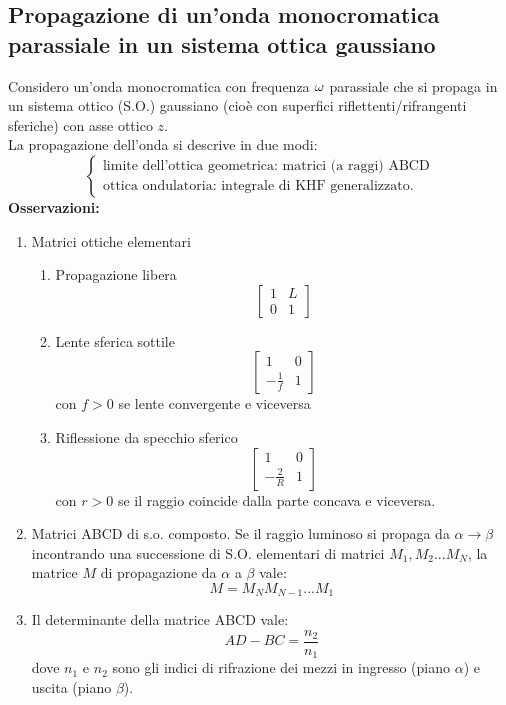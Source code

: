 \subsection{Propagazione di un'onda monocromatica parassiale in un sistema ottica gaussiano}
Considero un'onda monocromatica con frequenza $\omega$ parassiale che si propaga in un sistema ottico (S.O.) gaussiano (cioè con superfici riflettenti/rifrangenti sferiche) con asse ottico $z$.\\
La propagazione dell'onda si descrive in due modi:
\begin{equation*}
\begin{cases}
\text{limite dell'ottica geometrica: matrici (a raggi) ABCD}\\
\text{ottica ondulatoria: integrale di KHF generalizzato.}
\end{cases}
\end{equation*}
\textbf{Osservazioni:}\\
\begin{enumerate}
\item Matrici ottiche elementari
\begin{enumerate}
\item Propagazione libera
\[
\begin{bmatrix}
1	&	L\\
0	&	1
\end{bmatrix}
\]
\item Lente sferica sottile
\[
\begin{bmatrix}
1	&	0\\
-\frac{1}{f}	&	1
\end{bmatrix}
\]
con $f > 0$ se lente convergente e viceversa
\item Riflessione da specchio sferico
\[
\begin{bmatrix}
1	&	0\\
-\frac{2}{R}	&	1
\end{bmatrix}
\]
con $r >0$ se il raggio coincide dalla parte concava e viceversa.
\end{enumerate}
\item Matrici ABCD di s.o. composto. Se il raggio luminoso si propaga da $\alpha \rightarrow \beta$ incontrando una successione di S.O. elementari di matrici $M_1, M_2 ... M_N$, la matrice $M$ di propagazione da $\alpha$ a $\beta$ vale:
\begin{equation*}
M = M_NM_{N-1}...M_1
\end{equation*}
\item Il determinante della matrice ABCD vale:
\begin{equation*}
AD - BC = \frac{n_2}{n_1}
\end{equation*}
dove $n_1$ e $n_2$ sono gli indici di rifrazione dei mezzi in ingresso (piano $\alpha$) e uscita (piano $\beta$).
\end{enumerate}

